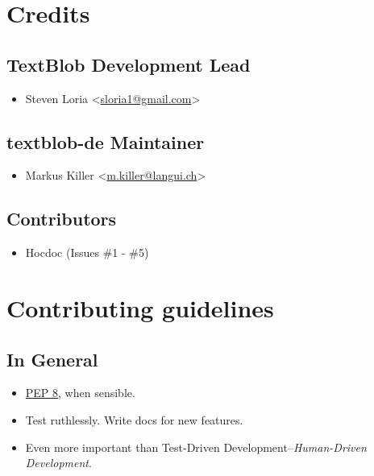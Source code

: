 \documentclass[letterpaper,10pt,english]{sphinxmanual}
\begin{document}
\section{Credits}
\label{authors:credits}\label{authors::doc}

\subsection{TextBlob Development Lead}
\label{authors:textblob-development-lead}\begin{itemize}
\item {} 
Steven Loria \textless{}\href{mailto:sloria1@gmail.com}{sloria1@gmail.com}\textgreater{}

\end{itemize}


\subsection{textblob-de Maintainer}
\label{authors:textblob-de-maintainer}\begin{itemize}
\item {} 
Markus Killer \textless{}\href{mailto:m.killer@langui.ch}{m.killer@langui.ch}\textgreater{}

\end{itemize}


\subsection{Contributors}
\label{authors:contributors}\begin{itemize}
\item {} 
Hocdoc (Issues \#1 - \#5)

\end{itemize}


\section{Contributing guidelines}
\label{contributing::doc}\label{contributing:contributing-guidelines}\label{contributing:textblob-de}

\subsection{In General}
\label{contributing:in-general}\begin{itemize}
\item {} 
\href{http://www.python.org/dev/peps/pep-0008/}{PEP 8}, when sensible.

\item {} 
Test ruthlessly. Write docs for new features.

\item {} 
Even more important than Test-Driven Development--\emph{Human-Driven Development}.

\end{itemize}
\end{document}
